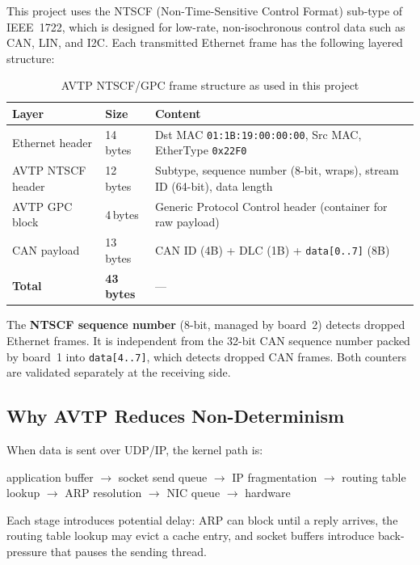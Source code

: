 \documentclass[11pt,a4paper]{article}
\begin{document}
This project uses the NTSCF (Non-Time-Sensitive Control Format) sub-type of IEEE~1722,
which is designed for low-rate, non-isochronous control data such as CAN, LIN, and I2C.
Each transmitted Ethernet frame has the following layered structure:

\begin{table}[H]
    \centering
    \caption{AVTP NTSCF/GPC frame structure as used in this project}
    \label{tab:avtp_frame}
    \begin{tabularx}{\textwidth}{|l|l|X|}
        \hline
        \textbf{Layer} & \textbf{Size} & \textbf{Content} \\
        \hline
        Ethernet header & 14\,bytes & Dst MAC \texttt{01:1B:19:00:00:00}, Src MAC, EtherType \texttt{0x22F0} \\
        \hline
        AVTP NTSCF header & 12\,bytes & Subtype, sequence number (8-bit, wraps), stream ID (64-bit), data length \\
        \hline
        AVTP GPC block & 4\,bytes & Generic Protocol Control header (container for raw payload) \\
        \hline
        CAN payload & 13\,bytes & CAN ID (4B) + DLC (1B) + \texttt{data[0..7]} (8B) \\
        \hline
        \textbf{Total} & \textbf{43\,bytes} & --- \\
        \hline
    \end{tabularx}
\end{table}

The \textbf{NTSCF sequence number} (8-bit, managed by board~2) detects dropped Ethernet
frames.  It is independent from the 32-bit CAN sequence number packed by board~1 into
\texttt{data[4..7]}, which detects dropped CAN frames.  Both counters are validated
separately at the receiving side.

\subsection{Why AVTP Reduces Non-Determinism}

When data is sent over UDP/IP, the kernel path is:

\begin{center}
application buffer $\to$ socket send queue $\to$ IP fragmentation $\to$
routing table lookup $\to$ ARP resolution $\to$ NIC queue $\to$ hardware
\end{center}

Each stage introduces potential delay: ARP can block until a reply arrives, the routing
table lookup may evict a cache entry, and socket buffers introduce back-pressure that
pauses the sending thread.
\end{document}
